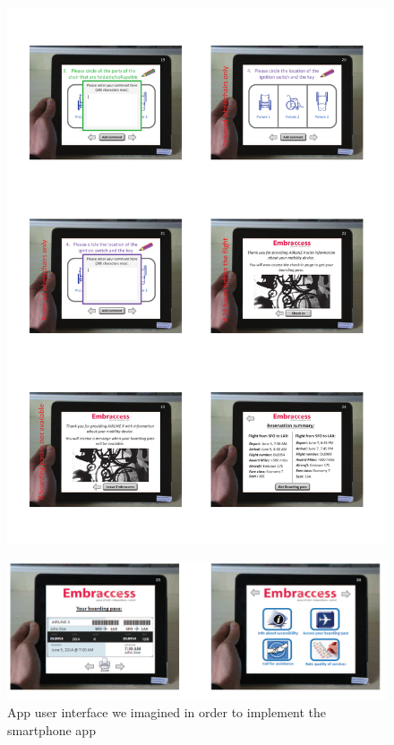 \begin{figure}[h]
  \centering
     \includegraphics[scale=0.75]{images/App_UI_4.pdf}
  \label{fig:App_UI_4}
\end{figure}

\begin{figure}[h]
  \centering
     \includegraphics[scale=0.5]{images/App_UI_5.png}
  \caption{App user interface we imagined in order to implement the smartphone app}
  \label{fig:App_UI_5}
\end{figure}

